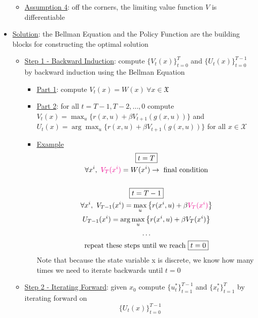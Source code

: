 \documentclass{article}
\begin{document}
\begin{itemize}
\begin{itemize}
        \item  \underline{Assumption 4}: off the corners, the limiting value function $V$ is differentiable
    \end{itemize}
    \item  \underline{Solution}: the Bellman Equation and the Policy Function are the building blocks for constructing the optimal solution
    \begin{itemize}
        \item  \underline{Step 1 - Backward Induction}: compute $\{ V_{t} (x) \}_{t=0}^{T}$ and $\{ U_{t} (x) \}_{t=0}^{T−1}$ by backward induction using the Bellman Equation
        \begin{itemize}
            \item \underline{Part 1}: compute $V_{t}(x) = W(x) \ \forall x \in \mathfrak{X}$
            \item  \underline{Part 2}: for all $t = T − 1, T −2, \dots, 0$ compute $V_{t}(x) = \max_{u} \{ r(x,u) + \beta V_{t+1} (g(x, u)) \}$ and $U_{t}(x) = \arg \max_{u} \{ r(x,u) + \beta V_{t+1} (g(x, u)) \}$ for all $x \in \mathcal{X}$
            \item \underline{Example}
            \begin{gather*}
                \boxed{t=T} \\
                \forall x^{i}, \ \begingroup\color{magenta} V_{T}(x^{i}) \endgroup = W(x^{i}) \rightarrow \ \text{final condition} \\
                \\
                \boxed{t=T-1} \\
                \forall x^{i}, \ V_{T-1}(x^{i}) = \max_{u} \left\{ r(x^{i}, u) + \beta \begingroup\color{magenta} V_{T}(x^{i}) \endgroup \right\} \\
                U_{T-1}(x^{i}) = \arg \max_{u} \left\{ r(x^{i}, u) + \beta V_{T}(x^{i}) \right\} \\
                \dots \\
                \text{repeat these steps until we reach} \ \boxed{t=0}
            \end{gather*}
            Note that because the state variable x is discrete, we know how many times we need to iterate backwards until $t=0$
        \end{itemize}
        \item  \underline{Step 2 - Iterating Forward}: given $x_{0}$ compute $\{u_{t}^{*}\}_{t=1}^{T−1}$ and $\{x_{t}^{*}\}_{t=1}^{T}$ by iterating forward on $$\{ U_{t} (x) \}_{t=0}^{T−1}$$

\end{itemize}
\end{itemize}
\end{document}
